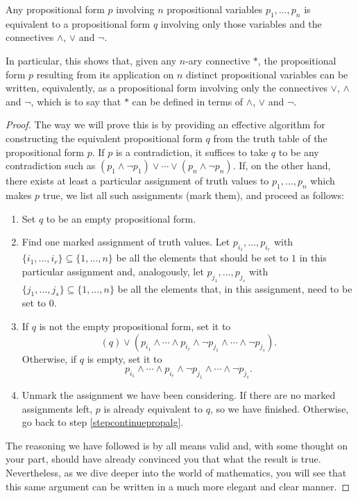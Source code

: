 \begin{theorem}
\label{ads1}
Any propositional form $p$ involving $n$ propositional variables $p_1,\ldots,p_n$ is equivalent to a propositional form $q$ involving only those variables and the connectives $\land$, $\lor$ and $\lnot$.

In particular, this shows that, given any $n$-ary connective $*$, the propositional form $p$ resulting from its application on $n$ distinct propositional variables can be written, equivalently, as a propositional form involving only the connectives $\lor$, $\land$ and $\lnot$, which is to say that $*$ can be defined in terms of $\land$, $\lor$ and $\lnot$.
\end{theorem}

\begin{proof}
The way we will prove this is by providing an effective algorithm for constructing the equivalent propositional form $q$ from the truth table of the propositional form $p$.
If $p$ is a contradiction, it suffices to take $q$ to be any contradiction such as $(p_1\land \lnot p_1) \lor \cdots \lor (p_n \land \lnot p_n)$.
If, on the other hand, there exists at least a particular assignment of truth values to $p_1,\ldots,p_n$ which makes $p$ true, we list all such assignments (mark them), and proceed as follows:
\begin{enumerate}
\item Set $q$ to be an empty propositional form.
\item \label{stepcontinuepropalg} Find one marked assignment of truth values. Let $p_{i_1},\ldots,p_{i_r}$ with $\{i_1,\ldots,i_r\}\subseteq \{1,\ldots,n\}$ be all the elements that should be set to $1$ in this particular assignment and, analogously, let $p_{j_1},\ldots,p_{j_s}$ with $\{j_1,\ldots,j_s\}\subseteq \{1,\ldots,n\}$ be all the elements that, in this assignment, need to be set to $0$.
\item If $q$ is not the empty propositional form, set it to
\[(q) \lor (p_{i_1} \land \cdots \land  p_{i_r} \land \lnot p_{j_1} \land \cdots \land \lnot p_{j_s}).\]
Otherwise, if $q$ is empty, set it to\
\[p_{i_1} \land \cdots \land  p_{i_r} \land \lnot p_{j_1} \land \cdots \land \lnot p_{j_s}.\]
\item Unmark the assignment we have been considering. If there are no marked assignments left, $p$ is already equivalent to $q$, so we have finished. Otherwise, go back to step \ref{stepcontinuepropalg}.
\end{enumerate}

The reasoning we have followed is by all means valid and, with some thought on your part, should have already convinced you that what the result is true. Nevertheless, as we dive deeper into the world of mathematics, you will see that this same argument can be written in a much more elegant and clear manner. 
\end{proof}

